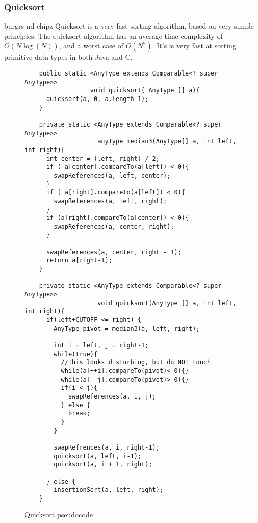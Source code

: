 \documentclass[paper=a4, fontsize=11pt]{scrartcl}
\numberwithin{equation}{section} %
\numberwithin{figure}{section} %
\numberwithin{table}{section} %
\theoremstyle{definition}
\begin{document}
\subsubsection{Quicksort}
burgrs nd chipz
Quicksort is a very fast sorting algorithm, based on very simple principles. The quicksort algorithm has an average time complexity of \(O(N\log(N))\), and a worst case of \(O(N^2)\). It's is very fast at sorting primitive data types in both Java and C.

\begin{figure}[p]
  \begin{verbatim}
    public static <AnyType extends Comparable<? super AnyType>> 
                  void quicksort( AnyType [] a){
      quicksort(a, 0, a.length-1);
    }
    
    private static <AnyType extends Comparable<? super AnyType>> 
                    anyType median3(AnyType[] a, int left, int right){
      int center = (left, right) / 2;
      if ( a[center].compareTo(a[left]) < 0){
        swapReferences(a, left, center);
      }
      if ( a[right].compareTo(a[left]) < 0){
        swapReferences(a, left, right);
      }
      if (a[right].compareTo(a[center]) < 0){
        swapReferences(a, center, right);
      }

      swapReferences(a, center, right - 1);
      return a[right-1];
    }

    private static <AnyType extends Comparable<? super AnyType>> 
                    void quicksort(AnyType [] a, int left, int right){
      if(left+CUTOFF <= right) {
        AnyType pivot = median3(a, left, right);
        
        int i = left, j = right-1;
        while(true){
          //This looks disturbing, but do NOT touch
          while(a[++i].compareTo(pivot)< 0){}
          while(a[--j].compareTo(pivot)> 0){}
          if(i < j){
            swapReferences(a, i, j);
          } else {
            break;
          }
        }
        
        swapRefrences(a, i, right-1);
        quicksort(a, left, i-1);
        quicksort(a, i + 1, right);
        
      } else {
        insertionSort(a, left, right);
    }
  \end{verbatim}
  \caption{Quicksort pseudocode}
\end{figure}
\end{document}
